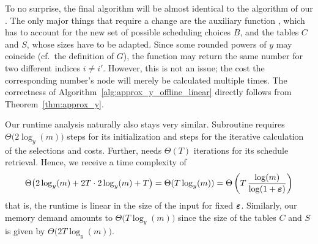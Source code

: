 To no surprise, the final algorithm will be almost identical to the algorithm of our . The only major things that require a change are the auxiliary function , which has to account for the new set of possible scheduling choices $B$, and the tables $C$ and $S$, whose sizes have to be adapted. Since some rounded powers of $y$ may coincide (cf.\ the definition of $G$), the function  may return the same number for two different indices $i\neq i'$. However, this is not an issue; the cost the corresponding number's node will merely be calculated multiple times.
The correctness of Algorithm~\ref{alg:approx_y_offline_linear} directly follows from Theorem~\ref{thm:approx_y}.

Our runtime analysis naturally also stays very similar. Subroutine  requires $\Theta\bigl(2\log_y(m)\bigr)$ steps for its initialization and  steps for the iterative calculation of the selections and costs. Further,  needs $\Theta(T)$ iterations for its schedule retrieval. Hence, we receive a time complexity of
\begin{equation*}
	\Theta\bigl(2\log_y(m)+2T\cdot2\log_y(m)+T\bigr)=\Theta(T\log_y(m))=\Theta\left(T\,\frac{\log(m)}{\log(1+\boldsymbol\varepsilon)}\right)
\end{equation*}
that is, the runtime is linear in the size of the input for fixed $\boldsymbol\varepsilon$. Similarly, our memory demand amounts to $\Theta\bigl(T\log_y(m)\bigr)$ since the size of the tables $C$ and $S$ is given by $\Theta\bigl(2T\log_y(m)\bigr)$.

